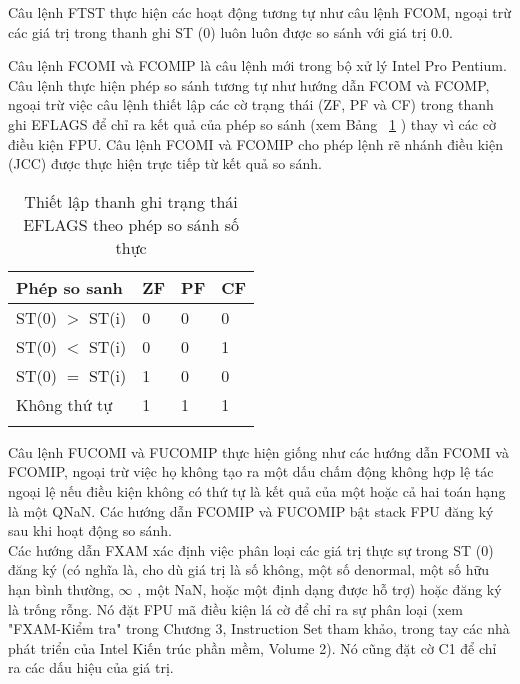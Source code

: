 		Câu lệnh FTST thực hiện các hoạt động tương tự như câu lệnh FCOM, ngoại trừ các giá trị trong thanh ghi ST (0) luôn luôn được so sánh với giá trị 0.0.
		
		Câu lệnh FCOMI và FCOMIP là câu lệnh mới trong bộ xử lý Intel Pro Pentium. Câu lệnh thực hiện phép so sánh tương tự như hướng dẫn FCOM và FCOMP, ngoại trừ việc câu lệnh thiết lập các cờ trạng thái (ZF, PF và CF) trong thanh ghi EFLAGS để chỉ ra kết quả của phép so sánh (xem Bảng ~\ref{tb:EFLAGS} ) thay vì các cờ điều kiện FPU. Câu lệnh FCOMI và FCOMIP cho phép lệnh rẽ nhánh điều kiện (JCC) được thực hiện trực tiếp từ kết quả so sánh.
		\begin{longtable}{|l|l|l|l|}
			\hline
				Phép so sanh & ZF & PF & CF \\
			\hline
			\hline
					ST(0) $>$ ST(i) & 0 & 0 & 0 \\	
			\hline
					ST(0) $<$ ST(i) & 0 & 0 & 1 \\	
			\hline
					ST(0) $=$ ST(i) & 1 & 0 & 0 \\	
			\hline
					Không thứ tự & 1 & 1 & 1 \\	
			\hline
				\caption{Thiết lập thanh ghi trạng thái EFLAGS theo phép so sánh số thực}
				\label{tb:EFLAGS}
		\end{longtable}	
		
		Câu lệnh FUCOMI và FUCOMIP thực hiện giống như các hướng dẫn FCOMI và FCOMIP, ngoại trừ việc họ không tạo ra một dấu chấm động không hợp lệ tác ngoại lệ nếu điều kiện không có thứ tự là kết quả của một hoặc cả hai toán hạng là một QNaN. Các hướng dẫn FCOMIP và FUCOMIP bật stack FPU đăng ký sau khi hoạt động so sánh.\\
		
		Các hướng dẫn FXAM xác định việc phân loại các giá trị thực sự trong ST (0) đăng ký (có nghĩa là, cho dù giá trị là số không, một số denormal, một số hữu hạn bình thường, $\mathbb{\infty}$ , một NaN, hoặc một định dạng được hỗ trợ) hoặc đăng ký là trống rỗng. Nó đặt FPU mã điều kiện lá cờ để chỉ ra sự phân loại (xem "FXAM-Kiểm tra" trong Chương 3, Instruction Set tham khảo, trong tay các nhà phát triển của Intel Kiến trúc phần mềm, Volume 2). Nó cũng đặt cờ C1 để chỉ ra các dấu hiệu của giá trị.
		
		\newpage

